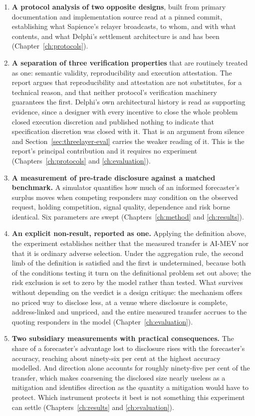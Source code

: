 \begin{enumerate}
  \item \textbf{A protocol analysis of two opposite designs}, built from primary
    documentation and implementation source read at a pinned commit, establishing what
    Sapience's relayer broadcasts, to whom, and with what contents, and what Delphi's
    settlement architecture is and has been (Chapter~\ref{ch:protocols}).
  \item \textbf{A separation of three verification properties} that are routinely treated as
    one: semantic validity, reproducibility and execution attestation. The report argues
    that reproducibility and attestation are not substitutes, for a technical reason, and
    that neither protocol's verification machinery guarantees the first. Delphi's own architectural
    history is read as supporting evidence, since a designer with every incentive to close
    the whole problem closed execution discretion and published nothing to indicate that
    specification discretion was closed with it. That is an argument from silence and
    Section~\ref{sec:threelayer-eval} carries the weaker reading of it. This is the report's
    principal contribution and it requires no experiment
    (Chapters~\ref{ch:protocols} and \ref{ch:evaluation}).
  \item \textbf{A measurement of pre-trade disclosure against a matched benchmark.} A
    simulator quantifies how much of an informed forecaster's surplus moves when competing
    responders may condition on the observed request, holding competition, signal quality,
    dependence and risk borne identical. Six parameters are swept
    (Chapters~\ref{ch:method} and \ref{ch:results}).
  \item \textbf{An explicit non-result, reported as one.} Applying the definition above, the
    experiment establishes neither that the measured transfer is AI-MEV nor that it is
    ordinary adverse selection. Under the aggregation rule, the second limb of the definition
    is satisfied and the first is undetermined, because both of the conditions testing it
    turn on the definitional problem set out above; the risk exclusion is set to zero by the
    model rather than tested. What survives without depending on the verdict is a design
    critique: the mechanism offers no priced way to disclose less, at a venue where
    disclosure is complete, address-linked and unpriced, and the entire measured transfer
    accrues to the quoting responders in the model (Chapter~\ref{ch:evaluation}).
  \item \textbf{Two subsidiary measurements with practical consequences.} The share of a
    forecaster's advantage lost to disclosure rises with the forecaster's accuracy, reaching
    about ninety-six per cent at the highest accuracy modelled. And direction alone accounts
    for roughly ninety-five per cent of the transfer, which makes coarsening the disclosed
    size nearly useless as a mitigation and identifies direction as the quantity a mitigation
    would have to protect. Which instrument protects it best is not something this experiment
    can settle (Chapters~\ref{ch:results} and \ref{ch:evaluation}).
\end{enumerate}


